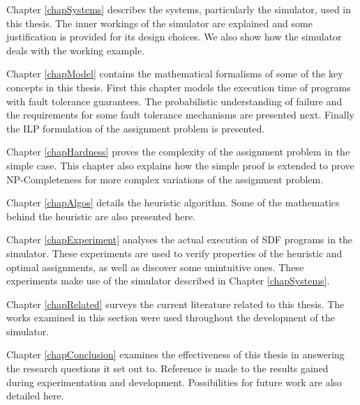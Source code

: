Chapter \ref{chapSystems} describes the systems, particularly the simulator, used in this thesis.
The inner workings of the simulator are explained and some justification is provided for its design choices.
We also show how the simulator deals with the working example.

Chapter \ref{chapModel} contains the mathematical formalisms of some of the key concepts in this thesis.
First this chapter models the execution time of programs with fault tolerance guarantees.
The probabilistic understanding of failure and the requirements for some fault tolerance mechanisms are presented next.
Finally the ILP formulation of the assignment problem is presented.

Chapter \ref{chapHardness} proves the complexity of the assignment problem in the simple case.
This chapter also explains how the simple proof is extended to prove NP-Completeness for more complex variations of the assignment problem.

Chapter \ref{chapAlgos} details the heuristic algorithm.
Some of the mathematics behind the heuristic are also presented here.

Chapter \ref{chapExperiment} analyses the actual execution of SDF programs in the simulator.
These experiments are used to verify properties of the heuristic and optimal assignments, as well as discover some unintuitive ones.
These experiments make use of the simulator described in Chapter \ref{chapSystems}.

Chapter \ref{chapRelated} surveys the current literature related to this thesis.
The works examined in this section were used throughout the development of the simulator.

Chapter \ref{chapConclusion} examines the effectiveness of this thesis in answering the research questions it set out to.
Reference is made to the results gained during experimentation and development.
Possibilities for future work are also detailed here.